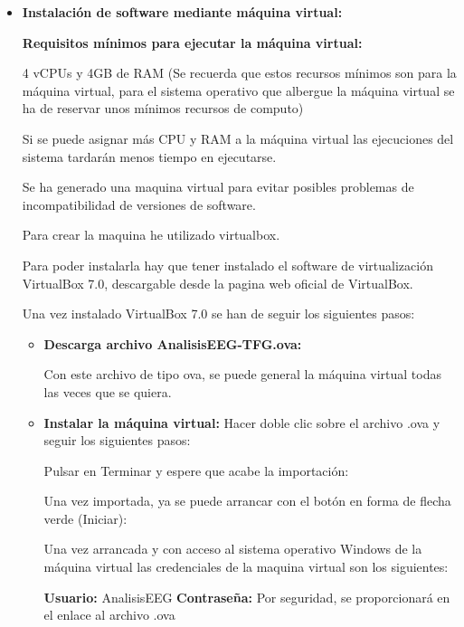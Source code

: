 \begin{itemize}


\item
\textbf{Instalación de software mediante máquina virtual:} 


\textbf{Requisitos mínimos para ejecutar la máquina virtual:}

4 vCPUs y 4GB de RAM (Se recuerda que estos recursos mínimos son para la máquina virtual, para el sistema operativo que albergue la máquina virtual se ha de reservar unos mínimos recursos de computo)

Si se puede asignar más CPU y RAM a la máquina virtual las ejecuciones del sistema tardarán menos tiempo en ejecutarse. 

Se ha generado una maquina virtual para evitar posibles problemas de incompatibilidad de versiones de software.

Para crear la maquina he utilizado virtualbox. ~\cite{virtual:box}

Para poder instalarla hay que tener instalado el software de virtualización VirtualBox 7.0, descargable desde la pagina web oficial de VirtualBox. ~\cite{virtual:box}

Una vez instalado VirtualBox 7.0 se han de seguir los siguientes pasos:

\begin{itemize}
\item
\textbf{Descarga archivo AnalisisEEG-TFG.ova:}

Con este archivo de tipo ova, se puede general la máquina virtual todas las veces que se quiera.

\item
\textbf{Instalar la máquina virtual:}
Hacer doble clic sobre el archivo .ova y seguir los siguientes pasos:



Pulsar en Terminar y espere que acabe la importación:




Una vez importada, ya se puede arrancar con el botón en forma de flecha verde (Iniciar):




Una vez arrancada y con acceso al sistema operativo Windows de la máquina virtual las credenciales de la maquina virtual son los siguientes:

\textbf{Usuario:} AnalisisEEG
\textbf{Contraseña:} Por seguridad, se proporcionará en el enlace al archivo .ova


\end{itemize}
\end{itemize}
